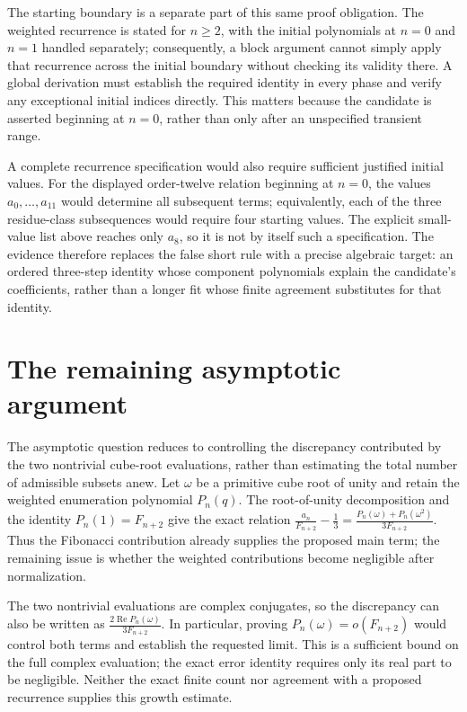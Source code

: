 \documentclass[11pt]{article}
\begin{document}
The starting boundary is a separate part of this same proof obligation. The weighted recurrence is stated for $n\geq 2$, with the initial polynomials at $n=0$ and $n=1$ handled separately; consequently, a block argument cannot simply apply that recurrence across the initial boundary without checking its validity there. A global derivation must establish the required identity in every phase and verify any exceptional initial indices directly. This matters because the candidate is asserted beginning at $n=0$, rather than only after an unspecified transient range.

A complete recurrence specification would also require sufficient justified initial values. For the displayed order-twelve relation beginning at $n=0$, the values $a_0,\ldots,a_{11}$ would determine all subsequent terms; equivalently, each of the three residue-class subsequences would require four starting values. The explicit small-value list above reaches only $a_8$, so it is not by itself such a specification. The evidence therefore replaces the false short rule with a precise algebraic target: an ordered three-step identity whose component polynomials explain the candidate’s coefficients, rather than a longer fit whose finite agreement substitutes for that identity.

\section{The remaining asymptotic argument}
The asymptotic question reduces to controlling the discrepancy contributed by the two nontrivial cube-root evaluations, rather than estimating the total number of admissible subsets anew. Let $\omega$ be a primitive cube root of unity and retain the weighted enumeration polynomial $P_n(q)$. The root-of-unity decomposition and the identity $P_n(1)=F_{n+2}$ give the exact relation $\displaystyle \frac{a_n}{F_{n+2}}-\frac13=\frac{P_n(\omega)+P_n(\omega^2)}{3F_{n+2}}$. Thus the Fibonacci contribution already supplies the proposed main term; the remaining issue is whether the weighted contributions become negligible after normalization.

The two nontrivial evaluations are complex conjugates, so the discrepancy can also be written as $\displaystyle \frac{2\operatorname{Re}P_n(\omega)}{3F_{n+2}}$. In particular, proving $P_n(\omega)=o(F_{n+2})$ would control both terms and establish the requested limit. This is a sufficient bound on the full complex evaluation; the exact error identity requires only its real part to be negligible. Neither the exact finite count nor agreement with a proposed recurrence supplies this growth estimate.
\end{document}
